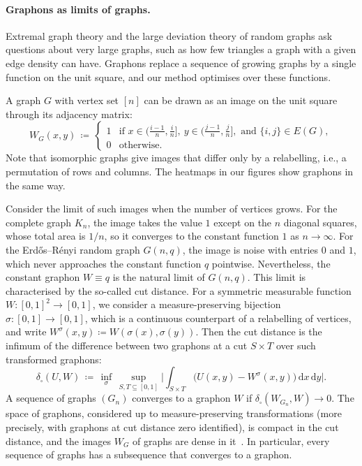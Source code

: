\documentclass{article}
\theoremstyle{plain}
\theoremstyle{definition}
\theoremstyle{remark}
\begin{document}
\paragraph{Graphons as limits of graphs.}
Extremal graph theory and the large deviation theory of random graphs ask questions about very large graphs, such as how few triangles a graph with a given edge density can have. Graphons replace a sequence of growing graphs by a single function on the unit square, and our method optimises over these functions.

A graph $G$ with vertex set $[n]$ can be drawn as an image on the unit square through its adjacency matrix:
\[
W_G(x, y) \,\coloneqq\,
\begin{cases}
1 & \text{if } x \in \bigl(\frac{i-1}{n}, \frac{i}{n}\bigr],\ y \in \bigl(\frac{j-1}{n}, \frac{j}{n}\bigr], \text{ and } \{i, j\} \in E(G), \\
0 & \text{otherwise}.
\end{cases}
\] Note that isomorphic graphs give images that differ only by a relabelling, i.e., a permutation of rows and columns. The heatmaps in our figures show graphons in the same way.

Consider the limit of such images when the number of vertices grows. For the complete graph $K_n$, the image takes the value $1$ except on the $n$ diagonal squares, whose total area is $1/n$, so it converges to the constant function $1$ as $n \to \infty$. For the Erd\H{o}s--R\'enyi random graph $G(n, q)$, the image is noise with entries $0$ and $1$, which never approaches the constant function $q$ pointwise. Nevertheless, the constant graphon $W \equiv q$ is the natural limit of $G(n, q)$. This limit is characterised by the so-called cut distance. For a symmetric measurable function $W : [0,1]^2 \to [0,1]$, we consider a measure-preserving bijection $\sigma : [0,1] \to [0,1]$, which is a continuous counterpart of a relabelling of vertices, and write $W^\sigma(x, y) \coloneqq W(\sigma(x), \sigma(y))$. Then the cut distance is the infimum of the difference between two graphons at a cut $S \times T$ over such transformed graphons:
\[
\delta_\square(U, W) \,\coloneqq\, \inf_{\sigma}\, \sup_{S, T \subseteq [0,1]} \biggl| \int_{S \times T} \bigl(U(x, y) - W^\sigma(x, y)\bigr)\, \mathrm{d}x\, \mathrm{d}y \biggr|.
\]
A sequence of graphs $(G_n)$ converges to a graphon $W$ if $\delta_\square(W_{G_n}, W) \to 0$. The space of graphons, considered up to measure-preserving transformations (more precisely, with graphons at cut distance zero identified), is compact in the cut distance, and the images $W_G$ of graphs are dense in it~\citep{lovasz2012large}. In particular, every sequence of graphs has a subsequence that converges to a graphon.
\end{document}
